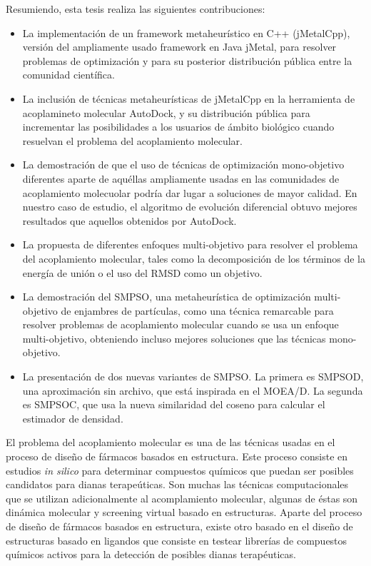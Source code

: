 Resumiendo, esta tesis realiza las siguientes contribuciones:

\begin{itemize}
	
	\item La implementación de un framework metaheurístico en C++ (jMetalCpp), versión del ampliamente usado framework en Java jMetal, para resolver problemas de optimización y para su posterior distribución pública entre la comunidad científica.
	
	\item La inclusión de técnicas metaheurísticas de jMetalCpp en la herramienta de acoplamineto molecular AutoDock, y su distribución pública para incrementar las posibilidades a los usuarios de ámbito biológico cuando resuelvan el problema del acoplamiento molecular.
	
	\item La demostración de que el uso de técnicas de optimización mono-objetivo diferentes aparte de aquéllas ampliamente usadas en las comunidades de acoplamiento molecuolar podría dar lugar a soluciones de mayor calidad. En nuestro caso de estudio, el algoritmo de evolución diferencial obtuvo mejores resultados que aquellos obtenidos por AutoDock.
	
	\item La propuesta de diferentes enfoques multi-objetivo para resolver el problema del acoplamiento molecular, tales como la decomposición de los términos de la energía de unión o el uso del RMSD como un objetivo.
	
	\item La demostración del SMPSO, una metaheurística de optimización multi-objetivo de enjambres de partículas, como una técnica remarcable para resolver problemas de acoplamiento molecular cuando se usa un enfoque multi-objetivo, obteniendo incluso mejores soluciones que las técnicas mono-objetivo.
	
	\item La presentación de dos nuevas variantes de SMPSO. La primera es SMPSOD, una aproximación sin archivo, que está inspirada en el MOEA/D. La segunda es SMPSOC, que usa la nueva similaridad del coseno para calcular el estimador de densidad.
	
\end{itemize}

El problema del acoplamiento molecular es una de las técnicas usadas en el proceso de diseño de fármacos basados en estructura. Este proceso consiste en estudios \emph{in silico} para determinar compuestos químicos que puedan ser posibles candidatos para dianas terapeúticas. Son muchas las técnicas computacionales que se utilizan adicionalmente al acomplamiento molecular, algunas de éstas son dinámica molecular y screening virtual basado en estructuras. Aparte del proceso de diseño de fármacos basados en estructura, existe otro basado en el diseño de estructuras basado en ligandos que consiste en testear librerías de compuestos químicos activos para la detección de posibles dianas terapéuticas. 

